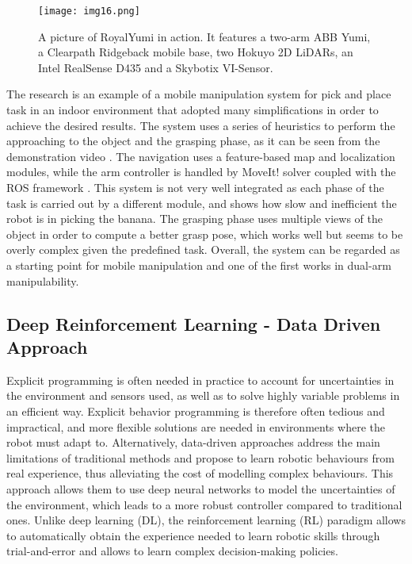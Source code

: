 \begin{figure}[H]
	\centering
	\texttt{[image: img16.png]}
	\captionsetup{width=0.8\linewidth}
	\caption{A picture of RoyalYumi in action. It features a two-arm ABB Yumi, a Clearpath 
	Ridgeback mobile base, two Hokuyo 2D LiDARs, an	Intel RealSense D435 and a Skybotix VI-Sensor.
	\cite{blomqvist2020gofetch}}
	\label{fig:img16}
\end{figure}

The research \cite{blomqvist2020gofetch} is an example of a mobile manipulation system
for pick and place task in an indoor environment that adopted many simplifications in order
to achieve the desired results. The system uses a series of heuristics to perform the
approaching to the object and the grasping phase, as it can be seen from the demonstration video
\cite{youtube2020gofetch}. The navigation uses a feature-based map and localization
modules, while the arm controller is handled by MoveIt! \cite{moveit2} solver coupled with
the ROS framework \cite{ros2}. This system is not very
well integrated as each phase of the task is carried out by a different module, and shows
how slow and inefficient the robot is in picking the banana. The grasping phase uses multiple
views of the object in order to compute a better grasp pose, which works well
but seems to be overly complex given the predefined task. Overall, the system 
can be regarded as a starting point for mobile manipulation and one of the first
works in dual-arm manipulability.

\subsection{Deep Reinforcement Learning - Data Driven Approach}

Explicit programming is often needed in practice to account for uncertainties in the environment and
sensors used, as well as to solve highly variable problems in an efficient way.
Explicit behavior programming is therefore often tedious and impractical, and more flexible solutions
are needed in environments where the robot must adapt to.
Alternatively, data-driven approaches address the main limitations of traditional methods and propose
to learn robotic behaviours from real experience, thus alleviating the cost of modelling complex behaviours.
This approach allows them to use deep neural networks to model the uncertainties of the environment,
which leads to a more robust controller compared to traditional ones.
Unlike deep learning (DL), the reinforcement learning (RL) paradigm allows to automatically obtain the
experience needed to learn robotic skills through trial-and-error and allows to learn complex decision-making
policies.


